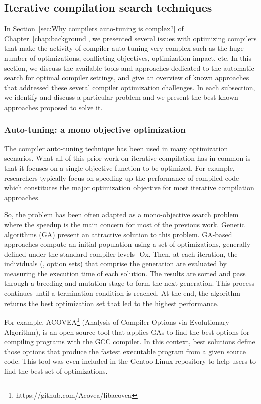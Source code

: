 \subsection{Iterative compilation search techniques}
In Section~\ref{sec:Why compilers auto-tuning is complex?} of Chapter~\ref{chap:background}, we presented several issues with optimizing compilers that make the activity of compiler auto-tuning very complex such as the huge number of optimizations, conflicting objectives, optimization impact, etc.
In this section, we discuss the available tools and approaches dedicated to the automatic search for optimal compiler settings, and give an overview of known approaches that addressed these several compiler optimization challenges. In each subsection, we identify and discuss a particular problem and we present the best known approaches proposed to solve it.

\subsubsection{Auto-tuning: a mono objective optimization}
The compiler auto-tuning technique has been used in many optimization scenarios.
What all of this prior work on iterative compilation has in common is that it focuses on a single objective function to be optimized. For example, researchers typically focus on speeding up the performance of compiled code which constitutes the major optimization objective for most iterative compilation approaches\cite{pan2006fast,haneda2005automatic,almagor2004finding,fursin2002evaluating,chen2010evaluating,cooper1999optimizing}. 

So, the problem has been often adapted as a mono-objective search problem where the speedup is the main concern for most of the previous work. 
Genetic algorithms (GA)\cite{stephenson2003genetic,bashkansky2007black} present an attractive solution to this problem. 
GA-based approaches compute an initial population using a set of optimizations, generally defined under the standard compiler levels -Ox. Then, at each iteration, the individuals (\ie, option sets) that comprise the generation are evaluated by measuring the execution time of each solution. The results are sorted and pass through a breeding and mutation stage to form the next generation. This
process continues until a termination condition is reached. At the end, the algorithm returns the best optimization set that led to the highest performance.

For example, ACOVEA\footnote{https://github.com/Acovea/libacovea} (Analysis of Compiler Options via Evolutionary Algorithm), is an open source tool that applies GAs to find the best options for compiling programs with the GCC compiler. In this context, best solutions define those options that produce the fastest executable program from a given source code. This tool was even included in the Gentoo Linux repository to help users to find the best set of optimizations.

